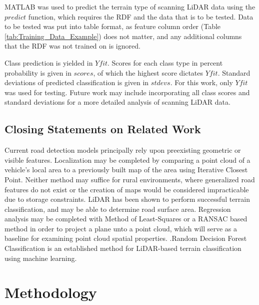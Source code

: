 \documentclass[numbered,pdftex]{ohio-etd}
\begin{document}
{{		{MATLAB was used to predict the terrain type of scanning LiDAR data using the $predict$ function, which requires the RDF and the data that is to be tested. Data to be tested was put into table format, as feature column order (Table \ref{tab:Training_Data_Example}) does not matter, and any additional columns that the RDF was not trained on is ignored.}
		
		
		
		{Class prediction is yielded in $Yfit$. Scores for each class type in percent probability is given in $scores$, of which the highest score dictates $Yfit$. Standard deviations of predicted classification is given in $stdevs$. For this work, only $Yfit$ was used for testing. Future work may include incorporating all class scores and standard deviations for a more detailed analysis of scanning LiDAR data.}
		
		
	} %
	
	\section{Closing Statements on Related Work}{
		
		{Current road detection models principally rely upon preexisting geometric or visible features. Localization may be completed by comparing a point cloud of a vehicle's local area to a previously built map of the area using Iterative Closest Point. Neither method may suffice for rural environments, where generalized road features do not exist or the creation of maps would be considered impracticable due to storage constraints. LiDAR has been shown to perform successful terrain classification, and may be able to determine road surface area. Regression analysis may be completed with Method of Least-Squares or a RANSAC based method in order to project a plane unto a point cloud, which will serve as a baseline for examining point cloud spatial properties. .Random Decision Forest Classification is an established method for LiDAR-based terrain classification using machine learning.}
		
	} %
	
} %

\chapter{Methodology}
\end{document}
